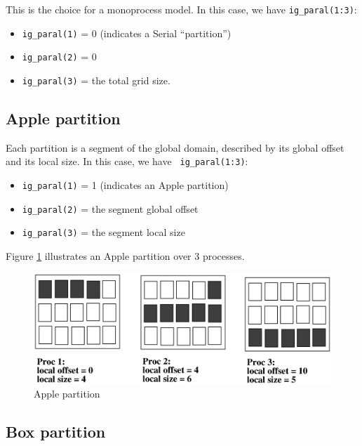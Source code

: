 This is the choice for a monoprocess model. In this case, we have 
{\tt ig\_paral(1:3)}:
\begin{itemize}
 \item {\tt ig\_paral(1)} = 0 (indicates a Serial ``partition'')
 \item {\tt ig\_paral(2)} = 0
 \item {\tt ig\_paral(3)} = the total grid size.
\end{itemize}

\subsection{Apple partition} 

Each partition is a segment of the global domain, described by its
global offset and its local size. In this case, we have {\tt
ig\_paral(1:3)}:
\begin{itemize}
 \item {\tt ig\_paral(1)} = 1 (indicates an Apple partition)
 \item {\tt ig\_paral(2)} = the segment global offset
 \item {\tt ig\_paral(3)} = the segment local size
\end{itemize}

Figure \ref{apple_partition} illustrates an Apple partition over 3
processes.
\begin{figure}
\includegraphics[scale=.6]{apple_new.eps} 
\caption{Apple partition}
\label{apple_partition}
\end{figure}


\subsection{Box partition} 

